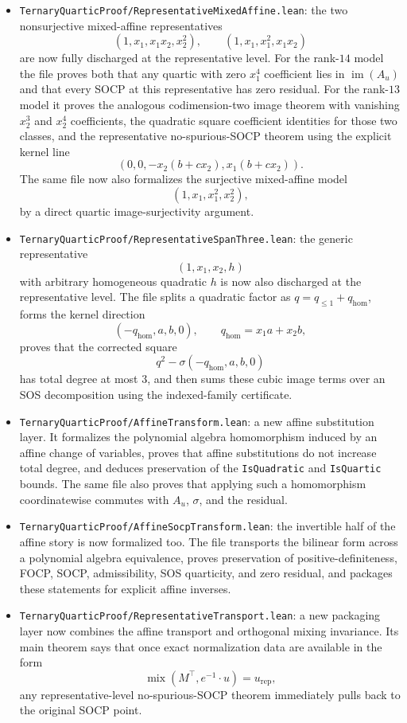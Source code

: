 \documentclass[11pt]{article}
\begin{document}
\begin{itemize}
\[  \]
  and hence equals the sum of its six monomial-coefficient terms.
\item \texttt{TernaryQuarticProof/RepresentativeMixedAffine.lean}: the
  two nonsurjective mixed-affine representatives
  \[
    (1, x_1, x_1x_2, x_2^2),
    \qquad
    (1, x_1, x_1^2, x_1x_2)
  \]
  are now fully discharged at the representative level. For the rank-$14$ model
  the file proves both that any quartic with zero $x_1^4$ coefficient lies in
  $\operatorname{im}(A_u)$ and that every SOCP at this representative has zero
  residual. For the rank-$13$ model it proves the analogous codimension-two
  image theorem with vanishing $x_2^3$ and $x_2^4$ coefficients, the quadratic
  square coefficient identities for those two classes, and the representative
  no-spurious-SOCP theorem using the explicit kernel line
  \[
    (0,0,-x_2(b+c x_2),x_1(b+c x_2)).
  \]
  The same file now also formalizes the surjective mixed-affine model
  \[
    (1, x_1, x_1^2, x_2^2),
  \]
  by a direct quartic image-surjectivity argument.
\item \texttt{TernaryQuarticProof/RepresentativeSpanThree.lean}: the generic
  representative
  \[
    (1,x_1,x_2,h)
  \]
  with arbitrary homogeneous quadratic $h$ is now also discharged at the
  representative level. The file splits a quadratic factor as
  $q=q_{\le 1}+q_{\mathrm{hom}}$, forms the kernel direction
  \[
    (-q_{\mathrm{hom}},a,b,0),\qquad q_{\mathrm{hom}}=x_1 a + x_2 b,
  \]
  proves that the corrected square
  \[
    q^2-\sigma(-q_{\mathrm{hom}},a,b,0)
  \]
  has total degree at most $3$, and then sums these cubic image terms over an
  SOS decomposition using the indexed-family certificate.
\item \texttt{TernaryQuarticProof/AffineTransform.lean}: a new affine
  substitution layer. It formalizes the polynomial algebra homomorphism
  induced by an affine change of variables, proves that affine substitutions do
  not increase total degree, and deduces preservation of the
  \texttt{IsQuadratic} and \texttt{IsQuartic} bounds. The same file also proves
  that applying such a homomorphism coordinatewise commutes with $A_u$,
  $\sigma$, and the residual.
\item \texttt{TernaryQuarticProof/AffineSocpTransform.lean}: the invertible
  half of the affine story is now formalized too. The file transports the
  bilinear form across a polynomial algebra equivalence, proves preservation of
  positive-definiteness, FOCP, SOCP, admissibility, SOS quarticity, and zero
  residual, and packages these statements for explicit affine inverses.
\item \texttt{TernaryQuarticProof/RepresentativeTransport.lean}: a new
  packaging layer now combines the affine transport and orthogonal mixing
  invariance. Its main theorem says that once exact normalization data are
  available in the form
  \[
    \operatorname{mix}(M^\top, e^{-1}\!\cdot u) = u_{\mathrm{rep}},
  \]
  any representative-level no-spurious-SOCP theorem immediately pulls back to
  the original SOCP point.
\end{itemize}
\end{document}
